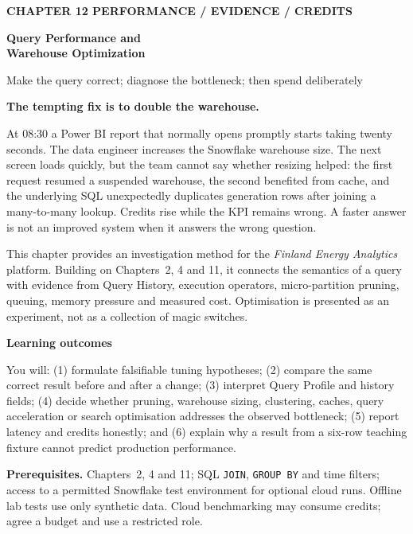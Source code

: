\documentclass[11pt,twoside]{article}
\begin{document}
{\sffamily\bfseries\fontsize{9}{11}\selectfont\color{steelblue} CHAPTER 12 \hfill PERFORMANCE / EVIDENCE / CREDITS}\par\vspace{3mm}
{\sffamily\bfseries\fontsize{20.0}{23}\selectfont\color{navy} Query Performance and\\Warehouse Optimization}\par\vspace{2mm}
{\sffamily\fontsize{11}{14}\selectfont\color{steelblue} Make the query correct; diagnose the bottleneck; then spend deliberately}\par\vspace{3mm}
\begin{insight}\textbf{The tempting fix is to double the warehouse.}\par
At 08:30 a Power BI report that normally opens promptly starts taking twenty seconds. The data engineer increases the Snowflake warehouse size. The next screen loads quickly, but the team cannot say whether resizing helped: the first request resumed a suspended warehouse, the second benefited from cache, and the underlying SQL unexpectedly duplicates generation rows after joining a many-to-many lookup. Credits rise while the KPI remains wrong. A faster answer is not an improved system when it answers the wrong question.
\end{insight}
This chapter provides an investigation method for the \emph{Finland Energy Analytics} platform. Building on Chapters~2, 4 and 11, it connects the semantics of a query with evidence from Query History, execution operators, micro-partition pruning, queuing, memory pressure and measured cost. Optimisation is presented as an experiment, not as a collection of magic switches.
\begin{whitebox}\textbf{Learning outcomes}\par
You will: (1) formulate falsifiable tuning hypotheses; (2) compare the same correct result before and after a change; (3) interpret Query Profile and history fields; (4) decide whether pruning, warehouse sizing, clustering, caches, query acceleration or search optimisation addresses the observed bottleneck; (5) report latency and credits honestly; and (6) explain why a result from a six-row teaching fixture cannot predict production performance.\end{whitebox}
\textbf{Prerequisites.} Chapters~2, 4 and 11; SQL \texttt{JOIN}, \texttt{GROUP BY} and time filters; access to a permitted Snowflake test environment for optional cloud runs. Offline lab tests use only synthetic data. Cloud benchmarking may consume credits; agree a budget and use a restricted role.
\end{document}
